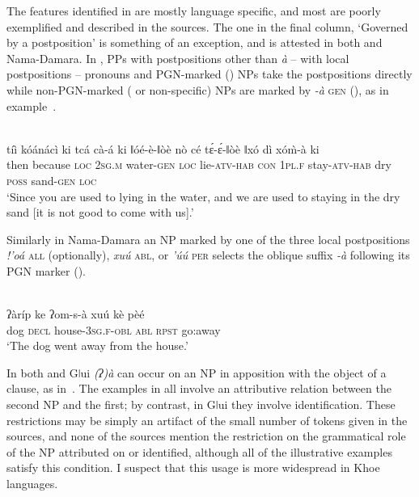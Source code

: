 \documentclass[output=paper]{LSP/langsci}
\begin{document}
\newpage 
The features identified in  are mostly language specific, and most are poorly exemplified and described in the sources. The one in the final column, ‘Governed by a postposition’ is something of an exception, and is attested in both  and Nama-Damara. In , PPs with postpositions other than \textit{à} – \ie with local postpositions – pronouns and PGN-marked (\ie {}) NPs take the postpositions directly while non-PGN-marked (\ie {} or non-specific) NPs are marked by \textit{-à} \textsc{gen} (\citealt[64]{Kilian-Hatz2008Grammar}), as in example~.

\begin{exe}
\ex\label{09-mc-ex:14} 
\\
\gll tíì kóánácì ki tcá cà-á ki ǁóé-è-ǁòè nò cé tɛ́-ɛ́-ǁòè ǁxó dì xóm̀-à ki\\
then because \textsc{loc} 2\textsc{sg.m} water-\textsc{gen} \textsc{loc} lie-\textsc{atv}-\textsc{hab} \textsc{con} 1\textsc{pl.f} stay-\textsc{atv}-\textsc{hab} dry \textsc{poss} sand-\textsc{gen} \textsc{loc}\\
\glt ‘Since you are used to lying in the water, and we are used to staying in the dry sand [it is not good to come with us].’ 
\end{exe}

Similarly in Nama-Damara an NP marked by one of the three local postpositions \textit{!’oá} \textsc{all} (optionally), \textit{xuú} \textsc{abl}, or \textit{’úú} \textsc{per} selects the oblique suffix \textit{-à} following its PGN marker (\citealt[112, 192–193]{Hagman1973Nama}).

\begin{exe}
\ex\label{09-mc-ex:15} 
\\
\gll ʔàríp ke ʔom-s-à xuú kè pèé\\
dog \textsc{decl} house-3\textsc{sg.f}-\textsc{obl} \textsc{abl} \textsc{rpst} go:away\\
\glt ‘The dog went away from the house.’ 
\end{exe}

In both  and Gǀui \textit{(ʔ)à} can occur on an NP in apposition with the object of a clause, as in~. The examples in  all involve an attributive relation between the second NP and the first; by contrast, in Gǀui they involve identification. These restrictions may be simply an artifact of the small number of tokens given in the sources, and none of the sources mention the restriction on the grammatical role of the NP attributed on or identified, although all of the illustrative examples satisfy this condition. I suspect that this usage is more widespread in Khoe languages.
\end{document}
